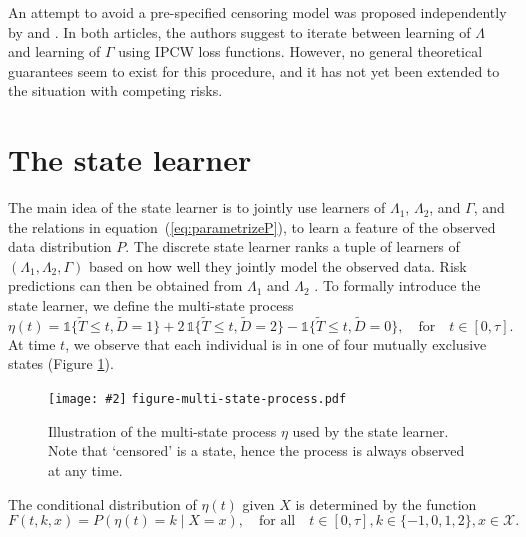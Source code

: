 \documentclass{statsoc}
\newcommand{\includeFigCond}[2][]{
  \ifx\nofig\undefined %
    \texttt{[image: \#2]} %
  \else %
    \texttt{#2} %
  \fi %
}
\newcommand{\1}{\mathds{1}}
\begin{document}
An attempt to avoid a pre-specified censoring model was proposed
independently by \cite{han2021inverse} and
\cite{westling2021inference}. In both articles, the authors suggest to
iterate between learning of \( \Lambda \) and learning of $\Gamma$
using IPCW loss functions. However, no general theoretical guarantees
seem to exist for this procedure, and it has not yet been extended to
the situation with competing risks.

\section{The state learner}
\label{sec:super-learner-simple}

The main idea of the state learner is to jointly use learners of
\( \Lambda_1 \), \( \Lambda_2 \), and \( \Gamma \), and the relations in
equation~(\ref{eq:parametrizeP}), to learn a feature of the observed data
distribution \( P \). The discrete state learner ranks a tuple of learners of
\( (\Lambda_1, \Lambda_2, \Gamma) \) based on how well they jointly model the
observed
data.
Risk predictions can then be obtained from
\( \Lambda_1 \) and $\Lambda_2$ \citep{benichou1990estimates, ozenne2017riskregression}. To formally
introduce the state learner, we define the multi-state process
\begin{equation*}
  \eta(t) = \1\{\tilde{T} \leq t, \tilde D=1\} + 2\,\1\{\tilde{T} \leq t, \tilde
  D=2\} - \1\{\tilde{T} \leq t, \tilde D=0\},
  \quad \text{for} \quad t \in [0, \tau].
\end{equation*}
At time \(t\), we observe that each individual is in one of four
mutually exclusive states (Figure \ref{fig:multi-state-process}).
\begin{figure}[h]
  \centering %
  \includeFigCond[width=.5\textwidth]{figure-multi-state-process.pdf}
  \caption{Illustration of the multi-state process \(\eta\) used by
    the state learner. Note that `censored' is a state, hence the
    process is always observed at any time.}
  \label{fig:multi-state-process}
\end{figure}
The conditional distribution of \( \eta(t) \) given \( X \) is determined by
the function
\begin{equation}
  \label{eq:F-def}
  F(t, k, x) = P(\eta(t) = k \mid X=x),
  \quad \text{for all} \quad
  t \in [0,\tau],
  k \in \{-1,0,1,2\},
  x \in \mathcal{X}.
\end{equation}
\end{document}

